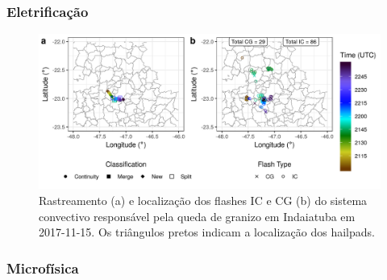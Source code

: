 \subsubsection{Eletrificação}\label{elec_20171115}



\begin{figure}[htb]
	\begin{center}
		\caption{Rastreamento (a) e localização dos flashes IC e CG (b) do sistema convectivo responsável pela queda de granizo em Indaiatuba em 2017-11-15. Os triângulos pretos indicam a localização dos hailpads.} 
		\label{track_flashes_20171115}
		\includegraphics[width=\columnwidth]{../General_Processing/figures/track_flashes_20171115.png}
	\end{center}
\end{figure}

\subsubsection{Microfísica}\label{micro_20171115}

